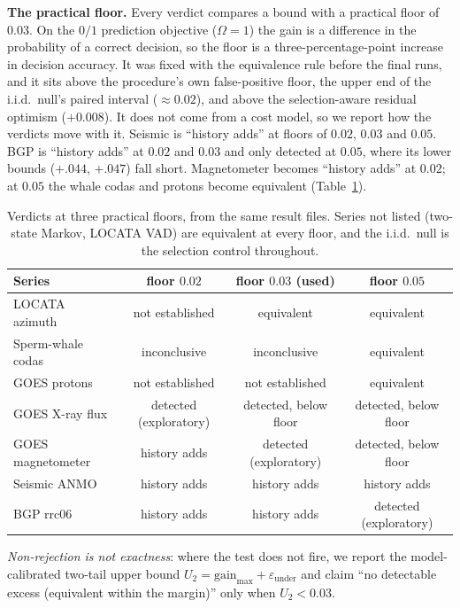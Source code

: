 \documentclass[acmsmall,screen,review,anonymous]{acmart}
\begin{document}
\textbf{The practical floor.} Every verdict compares a bound with a
practical floor of $0.03$. On the $0/1$ prediction objective ($\Omega=1$)
the gain is a difference in the probability of a correct decision, so the
floor is a three-percentage-point increase in decision accuracy. It was
fixed with the equivalence rule before the final runs, and it sits above
the procedure's own false-positive floor, the upper end of the i.i.d.\ null's
paired interval ($\approx0.02$), and above the selection-aware residual
optimism ($+0.008$). It does not come from a cost model, so
we report how the verdicts move with it. Seismic is ``history adds'' at
floors of $0.02$, $0.03$ and $0.05$. BGP is ``history adds'' at $0.02$ and
$0.03$ and only detected at $0.05$, where its lower bounds ($+.044$,
$+.047$) fall short. Magnetometer becomes ``history adds'' at $0.02$; at
$0.05$ the whale codas and protons become equivalent (Table~\ref{tab:floor}).

\begin{table}[h]\centering\footnotesize
\begin{tabular}{lccc}
\toprule
Series & floor $0.02$ & floor $0.03$ (used) & floor $0.05$ \\
\midrule
LOCATA azimuth & not established & equivalent & equivalent \\
Sperm-whale codas & inconclusive & inconclusive & equivalent \\
GOES protons & not established & not established & equivalent \\
GOES X-ray flux & detected (exploratory) & detected, below floor & detected, below floor \\
GOES magnetometer & history adds & detected (exploratory) & detected, below floor \\
Seismic ANMO & history adds & history adds & history adds \\
BGP rrc06 & history adds & history adds & detected (exploratory) \\
\bottomrule
\end{tabular}
\caption{Verdicts at three practical floors, from the same result files.
Series not listed (two-state Markov, LOCATA VAD) are equivalent at every
floor, and the i.i.d.\ null is the selection control throughout.}
\label{tab:floor}
\end{table}

\emph{Non-rejection is not exactness}: where the test does not fire, we
report the model-calibrated two-tail upper bound
$U_2=\text{gain}_{\max}+\varepsilon_{\mathrm{under}}$ and claim ``no
detectable excess (equivalent within the margin)'' only when $U_2<0.03$.
\end{document}
